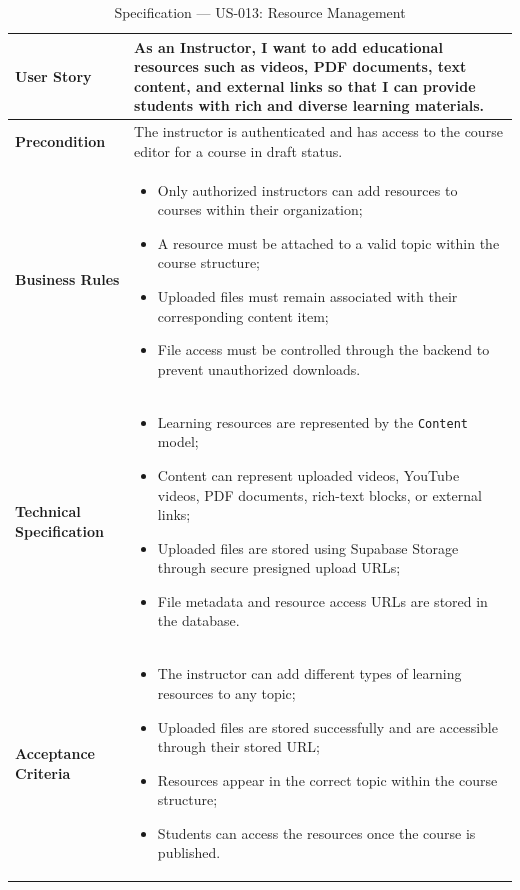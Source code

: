 \begin{table}[H]
\centering
\caption{Specification — US-013: Resource Management}
\label{tab:us013}
\renewcommand{\arraystretch}{1}
\begin{tabularx}{\textwidth}{|p{2.5cm}|X|}
\hline
\textbf{User Story} & As an Instructor, I want to add educational resources such as videos, PDF documents, text content, and external links so that I can provide students with rich and diverse learning materials. \\
\hline
\textbf{Precondition} & The instructor is authenticated and has access to the course editor for a course in draft status. \\
\hline
\textbf{Business Rules} &
\begin{itemize}
  \item Only authorized instructors can add resources to courses within their organization;
  \item A resource must be attached to a valid topic within the course structure;
  \item Uploaded files must remain associated with their corresponding content item;
  \item File access must be controlled through the backend to prevent unauthorized downloads.
\end{itemize} \\
\hline
\textbf{Technical Specification} &
\begin{itemize}
  \item Learning resources are represented by the \texttt{Content} model;
  \item Content can represent uploaded videos, YouTube videos, PDF documents, rich-text blocks, or external links;
  \item Uploaded files are stored using Supabase Storage through secure presigned upload URLs;
  \item File metadata and resource access URLs are stored in the database.
\end{itemize} \\
\hline
\textbf{Acceptance Criteria} &
\begin{itemize}
  \item The instructor can add different types of learning resources to any topic;
  \item Uploaded files are stored successfully and are accessible through their stored URL;
  \item Resources appear in the correct topic within the course structure;
  \item Students can access the resources once the course is published.
\end{itemize} \\
\hline
\end{tabularx}
\end{table}

